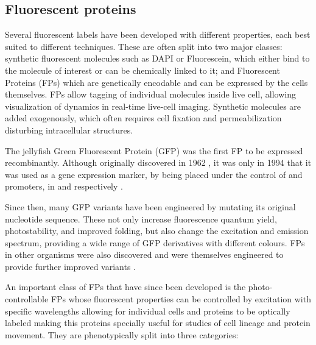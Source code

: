   \subsection{Fluorescent proteins}
    Several fluorescent labels have been developed with different
    properties, each best suited to different techniques.
    These are often split into two major classes: synthetic fluorescent
    molecules such as DAPI or Fluorescein, which either bind to the molecule of
    interest or can be chemically linked to it; and Fluorescent Proteins (FPs)
    which are genetically encodable and can be expressed by the cells themselves.
    FPs allow tagging of individual molecules inside live cell, allowing
    visualization of dynamics in real-time live-cell imaging.
    Synthetic molecules are added exogenously, which often requires cell
    fixation and permeabilization disturbing intracellular structures.

    The  jellyfish Green Fluorescent Protein (GFP) was
    the first FP to be expressed recombinantly.
    Although originally discovered in 1962 \citep{shimomura1962-gfp-discovery},
    it was only in 1994 that it was used as a gene expression
    marker, by being placed under the control of  and
     promoters, in  and 
    respectively \citep{gfp-first-expression-marker}.

    Since then, many GFP variants have been engineered by mutating its
    original nucleotide sequence.  These not only increase fluorescence
    quantum yield, photostability, and improved folding, but also change
    the excitation and emission spectrum, providing a wide range of GFP
    derivatives with different colours.  FPs in other organisms were also
    discovered and were themselves engineered to provide further improved
    variants \citep{FP-color-palette}.

    An important class of FPs that have since been developed is the
    photo-controllable FPs whose
    fluorescent properties can be controlled by excitation with specific
    wavelengths allowing for individual cells and proteins to be optically
    labeled making this proteins specially useful for studies of cell
    lineage and protein movement.
    They are phenotypically split into three categories:

